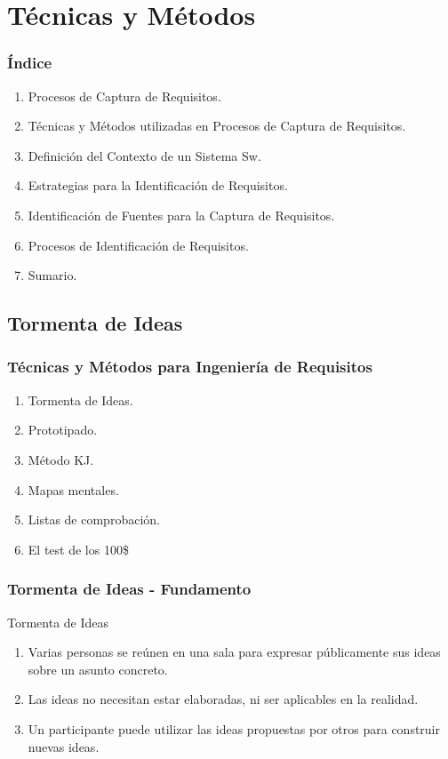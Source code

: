 ﻿\documentclass[handout,a4paper,slidestop,xcolor=pst,dvips,blue]{beamer}
\begin{document}
\section{Técnicas y Métodos}

\begin{frame}[c]
    \frametitle{Índice}
    \begin{enumerate}
         \item Procesos de Captura de Requisitos.
         \item \alert{Técnicas y Métodos utilizadas en Procesos de Captura de Requisitos}.
         \item Definición del Contexto de un Sistema Sw.
         \item Estrategias para la Identificación de Requisitos.
         \item Identificación de Fuentes para la Captura de Requisitos.
         \item Procesos de Identificación de Requisitos.
         \item Sumario.
    \end{enumerate}
\end{frame}

\subsection{Tormenta de Ideas}

\begin{frame}[c]
    \frametitle{Técnicas y Métodos para Ingeniería de Requisitos}
    \begin{enumerate}
         \item \alert<2->{Tormenta de Ideas}.
         \item Prototipado.
         \item Método KJ.
         \item Mapas mentales.
         \item Listas de comprobación.
         \item El test de los 100\$
    \end{enumerate}
\end{frame}

\begin{frame}[t]
    \frametitle{Tormenta de Ideas - Fundamento}
    \begin{block}{Tormenta de Ideas}
        \begin{enumerate}[<+->]
            \item Varias personas se reúnen en una sala para expresar públicamente sus ideas sobre un asunto concreto.
            \item Las ideas no necesitan estar elaboradas, ni ser aplicables en la realidad.
            \item Un participante puede utilizar las ideas propuestas por otros para construir nuevas ideas.
        \end{enumerate}
    \end{block}
\end{frame}
\end{document}
